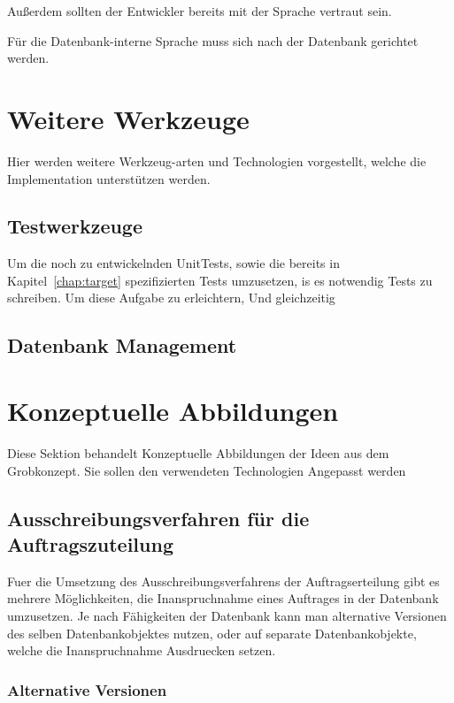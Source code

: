 Außerdem sollten der Entwickler bereits mit der Sprache vertraut sein.

Für die Datenbank-interne Sprache muss sich nach der Datenbank gerichtet werden.


\section{Weitere Werkzeuge}

Hier werden weitere Werkzeug-arten und Technologien vorgestellt,
welche die Implementation unterstützen werden.

\subsection{Testwerkzeuge}

Um die noch zu entwickelnden UnitTests,
sowie die bereits in Kapitel~\ref{chap:target} spezifizierten Tests umzusetzen,
is es notwendig Tests zu schreiben. Um diese Aufgabe zu erleichtern,
Und gleichzeitig 

\subsection{Datenbank Management}


\section{Konzeptuelle Abbildungen}

Diese Sektion behandelt Konzeptuelle Abbildungen der Ideen aus dem Grobkonzept.
Sie sollen den verwendeten Technologien Angepasst werden

\subsection{Ausschreibungsverfahren für die Auftragszuteilung}

Fuer die Umsetzung des Ausschreibungsverfahrens der Auftragserteilung gibt es
mehrere Möglichkeiten, die Inanspruchnahme eines Auftrages in
der Datenbank umzusetzen. Je nach Fähigkeiten der Datenbank kann man 
alternative Versionen des selben Datenbankobjektes nutzen,
oder auf separate Datenbankobjekte, welche die Inanspruchnahme Ausdruecken setzen.

\subsubsection{Alternative Versionen}

